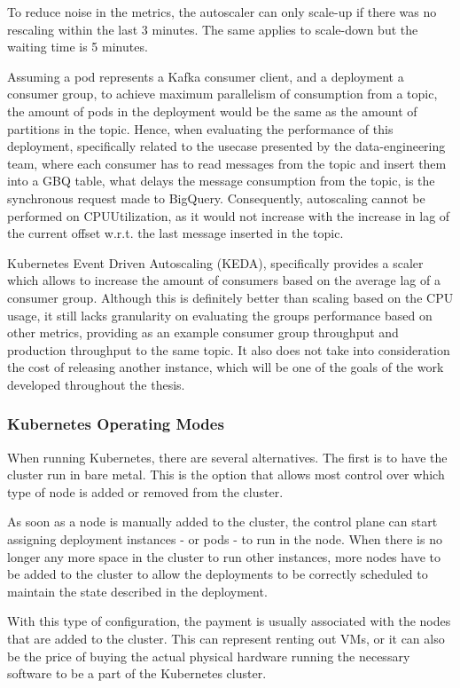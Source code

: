 To reduce noise in the metrics, the autoscaler can only scale-up if there was no rescaling within the last 3 minutes. The same applies to scale-down but the waiting time is 5 minutes.

Assuming a pod represents a Kafka consumer client, and a deployment a consumer group, to achieve maximum parallelism of consumption from a topic, the amount of pods in the deployment would be the same as the amount of partitions in the topic. Hence, when evaluating the performance of this deployment, specifically related to the usecase presented by the data-engineering team, where each consumer has to read messages from the topic and insert them into a GBQ table, what delays the message consumption from the topic, is the synchronous request made to BigQuery. Consequently, autoscaling cannot be performed on CPUUtilization, as it would not increase with the increase in lag of the current offset w.r.t. the last message inserted in the topic.

Kubernetes Event Driven Autoscaling (KEDA), specifically provides a scaler which allows to increase the amount of consumers based on the average lag of a consumer group. Although this is definitely better than scaling based on the CPU usage, it still lacks granularity on evaluating the groups performance based on other metrics, providing as an example consumer group throughput and production throughput to the same topic. It also does not take into consideration the cost of releasing another instance, which will be one of the goals of the work developed throughout the thesis.

\subsubsection{Kubernetes Operating Modes}

When running Kubernetes, there are several alternatives. The first is to have the cluster run in bare metal. This is the option that allows most control over which type of node is added or removed from the cluster. 

As soon as a node is manually added to the cluster, the control plane can start assigning deployment instances - or pods - to run in the node. When there is no longer any more space in the cluster to run other instances, more nodes have to be added to the cluster to allow the deployments to be correctly scheduled to maintain the state described in the deployment.

With this type of configuration, the payment is usually associated with the nodes that are added to the cluster. This can represent renting out VMs, or it can also be the price of buying the actual physical hardware running the necessary software to be a part of the Kubernetes cluster.

